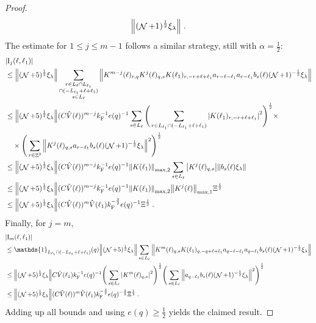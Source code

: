 \documentclass[12pt,a4paper]{article}
\numberwithin{equation}{section}
\newcommand{\1}{\mathbb{I}}
\newcommand{\F}{\mathrm{F}}
\newcommand{\I}{\mathrm{I}}
\DeclareMathOperator{\Z}{\mathbb{Z}}
\DeclareMathOperator{\NN}{\mathcal{N}}
\newcommand{\half}{\frac{1}{2}}
\theoremstyle{plain}
\theoremstyle{definition}
\theoremstyle{remark}
\theoremstyle{plain}
\theoremstyle{definition}
\theoremstyle{remark}
\begin{document}
\begin{proof}
\begin{equation}
		\norm{(\NN+1)^\half \xi_\lambda} \;. \label{eq:estEQ1121}
\end{equation} 
The estimate for $ 1 \le j \le m-1 $ follows a similar strategy, still with $ \alpha = \half $:
\begin{align}
	&|\I_j(\ell, \ell_1)| \nonumber\\
	&\leq \norm{ (\NN+5)^{\half} \xi_\lambda}
		\sum_{\substack{r\in L_{\ell} \cap L_{\ell_1} \\ \cap (-L_{\ell_1} + \ell + \ell_1)\\s\in L_{\ell}}}
		\norm{K^{m-j}(\ell)_{r,q} K^j(\ell)_{q,s} K(\ell_1)_{r,-r+\ell+\ell_1} a_{r-\ell-\ell_1} a_{r-\ell_1} b_{s}(\ell) (\NN+1)^{-\half} \xi_\lambda }\nonumber\\
	&\leq \norm{ (\NN+5)^{\half} \xi_\lambda} 
		(C \hat{V}(\ell))^{m-j} k_{\F}^{-1} e(q)^{-1}
		\sum_{s\in L_{\ell}}
		\Bigg(\sum_{r\in L_{\ell_1} \cap (-L_{\ell_1} + \ell + \ell_1)}\abs{ K(\ell_1)_{r,-r+\ell+\ell_1} }^2\Bigg)^\half \times\nonumber\\
	&\quad \times\Bigg( \sum_{r \in \Z^3}\norm{K^{j}(\ell)_{q,s} a_{r-\ell_1} b_{s}(\ell) (\NN+1)^{-\half} \xi_\lambda }^2 \Bigg)^\half \nonumber\\
	&\leq \norm{ (\NN+5)^{\half} \xi_\lambda}
		(C \hat{V}(\ell))^{m-j} k_{\F}^{-1} e(q)^{-1}
		\norm{K(\ell_1)}_{\max,2}
		\sum_{s\in L_{\ell}}\abs{K^{j}(\ell)_{q,s}}
		\norm{b_{s}(\ell) \xi_\lambda }		
	\nonumber\\
	&\leq \norm{(\NN+5)^\half \xi_\lambda }
		(C \hat{V}(\ell))^{m-j} k_{\F}^{-1} e(q)^{-1}
		\norm{ K(\ell_1) }_{\max,2}
		\norm{ K^{j}(\ell)}_{\mathrm{max,1}} \Xi^\half \nonumber \\
	&\leq \norm{(\NN+5)^\half \xi_\lambda }
		(C \hat{V}(\ell))^m
		\hat{V}(\ell_1)
		k_{\F}^{-\frac 32} e(q)^{-1} \Xi^\half \;.
\end{align}
Finally, for $ j = m $,
\begin{align}
	&|\I_m(\ell, \ell_1)| \nonumber\\
	&\leq \mathds{1}_{L_{\ell_1} \cap (-L_{\ell_1} + \ell + \ell_1)}(q) \norm{(\NN+5)^{\half} \xi_\lambda}
		\sum_{s \in L_{\ell}}
		\norm{ K^m(\ell)_{q,s} K(\ell_1)_{q,-q+\ell+\ell_1} a_{q-\ell-\ell_1} a_{q-\ell_1} b_{s}(\ell) (\NN+1)^{-\half} \xi_\lambda } \nonumber\\
	&\leq \norm{(\NN+5)^{\half} \xi_\lambda}
		C \hat{V}(\ell_1) k_{\F}^{-1} e(q)^{-1}
		\Bigg( \sum_{s \in L_{\ell}} \abs{K^m(\ell)_{q,s}}^2\Bigg)^\half \Bigg(\sum_{s \in L_{\ell}} \norm{ a_{q-\ell_1} b_s(\ell) (\NN+1)^{-\half} \xi_\lambda }^2\Bigg)^\half \nonumber\\
	&\leq \norm{(\NN+5)^\half \xi_\lambda }
		(C \hat{V}(\ell))^m
		\hat{V}(\ell_1)
		k_{\F}^{-\frac 32} e(q)^{-\frac 32} \Xi^\half \;. \label{eq:estEQ1123}
\end{align}
Adding up all bounds and using $ e(q) \ge \half $ yields the claimed result.
\end{proof}
\end{document}
